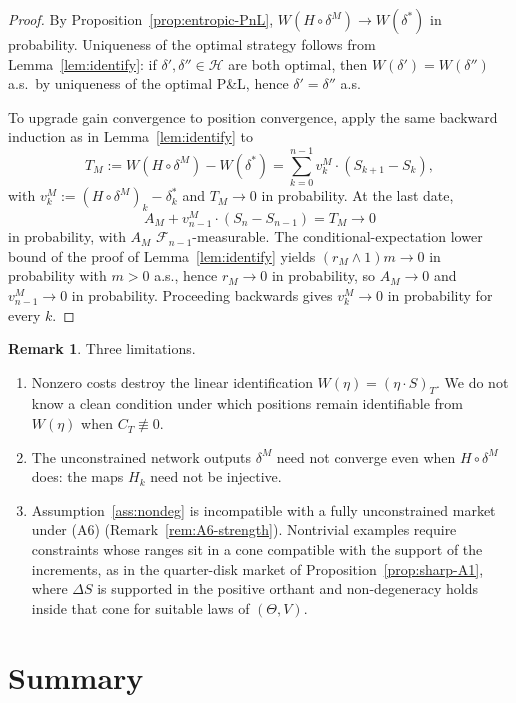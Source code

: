 \documentclass[11pt,a4paper]{report}
\numberwithin{equation}{chapter}
\theoremstyle{plain}
\theoremstyle{definition}
\newtheorem{remark}[proposition]{Remark}
\newcommand{\F}{\mathcal{F}}
\newcommand{\HH}{\mathcal{H}}
\begin{document}
\begin{proof}
    By Proposition~\ref{prop:entropic-PnL}, $W(H\circ\delta^M)\to W(\delta^*)$ in probability. Uniqueness of the optimal strategy follows from Lemma~\ref{lem:identify}: if $\delta',\delta''\in\HH$ are both optimal, then $W(\delta')=W(\delta'')$ a.s.\ by uniqueness of the optimal P\&L, hence $\delta'=\delta''$ a.s.

    To upgrade gain convergence to position convergence, apply the same backward induction as in Lemma~\ref{lem:identify} to
    \[
        T_M:=W(H\circ\delta^M)-W(\delta^*)=\sum_{k=0}^{n-1}v^M_k\cdot(S_{k+1}-S_k),
    \]
    with $v^M_k:=(H\circ\delta^M)_k-\delta^*_k$ and $T_M\to0$ in probability. At the last date,
    \[
        A_M+v^M_{n-1}\cdot(S_n-S_{n-1})=T_M\to0
    \]
    in probability, with $A_M$ $\F_{n-1}$-measurable. The conditional-expectation lower bound of the proof of Lemma~\ref{lem:identify} yields $(r_M\wedge1)m\to0$ in probability with $m>0$ a.s., hence $r_M\to0$ in probability, so $A_M\to0$ and $v^M_{n-1}\to0$ in probability. Proceeding backwards gives $v^M_k\to0$ in probability for every $k$.
\end{proof}

\begin{remark}\label{rem:strategy-limits}
    Three limitations.
    \begin{enumerate}[leftmargin=*,itemsep=0pt,parsep=0pt]
        \item[\textup{(i)}] Nonzero costs destroy the linear identification $W(\eta)=(\eta\cdot S)_T$. We do not know a clean condition under which positions remain identifiable from $W(\eta)$ when $C_T\not\equiv0$.
        \item[\textup{(ii)}] The unconstrained network outputs $\delta^M$ need not converge even when $H\circ\delta^M$ does: the maps $H_k$ need not be injective.
        \item[\textup{(iii)}] Assumption~\ref{ass:nondeg} is incompatible with a fully unconstrained market under (A6) (Remark~\ref{rem:A6-strength}). Nontrivial examples require constraints whose ranges sit in a cone compatible with the support of the increments, as in the quarter-disk market of Proposition~\ref{prop:sharp-A1}, where $\Delta S$ is supported in the positive orthant and non-degeneracy holds inside that cone for suitable laws of $(\Theta,V)$.
    \end{enumerate}
\end{remark}

\section{Summary}\label{sec:summary-A}
\end{document}
